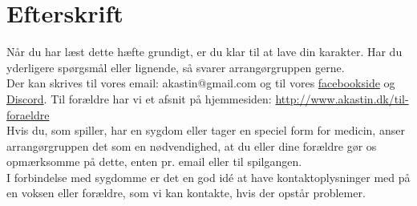 \chapter*{Efterskrift}
Når du har læst dette hæfte grundigt, er du klar til at lave din karakter. Har du yderligere spørgsmål eller lignende, så svarer arrangørgruppen gerne.\\
Der kan skrives til vores email: akastin@gmail.com
og til vores \href{https://www.facebook.com/groups/105480345934/?fref=nf}{facebookside} og \href{https://discord.gg/3Ykbtag}{Discord}. 
Til forældre har vi et afsnit på hjemmesiden: \url{http://www.akastin.dk/til-foraeldre}\\
Hvis du, som spiller, har en sygdom eller tager en speciel form for medicin, anser arrangørgruppen det som en nødvendighed, at du eller dine forældre gør os opmærksomme på dette, enten pr. email eller til spilgangen.\\
I forbindelse med sygdomme er det en god idé at have kontaktoplysninger med på en voksen eller forældre, som vi kan kontakte, hvis der opstår problemer. 